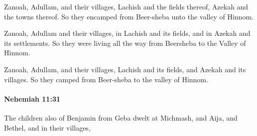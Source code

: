 			\begin{versebox}
					\item[BHS] 
					\item[LXX] 
					\item[ASV] Zanoah, Adullam, and their villages, Lachish and the fields thereof, Azekah and the towns thereof. So they encamped from Beer-sheba unto the valley of Hinnom.
					\item[NIV] Zanoah, Adullam and their villages, in Lachish and its fields, and in Azekah and its settlements. So they were living all the way from Beersheba to the Valley of Hinnom.
					\item[NRSV] Zanoah, Adullam, and their villages, Lachish and its fields, and Azekah and its villages. So they camped from Beer-sheba to the valley of Hinnom.
			\end{versebox}

		\paragraph{Nehemiah 11:31} %
			\label{NEHEMIAH-11-31}

			The children also of Benjamin from Geba dwelt at Michmash, and Aija, and Bethel, and in their villages,

